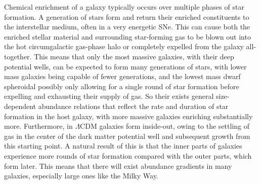 Chemical enrichment of a galaxy typically occurs over multiple phases of star formation. A generation of stars form and return their enriched constituents to the interstellar medium, often in a very energetic SNe. This can cause both the enriched stellar material and surrounding star-forming gas to be blown out into the hot circumgalactic gas-phase halo or completely expelled from the galaxy all-together. This means that only the most massive galaxies, with their deep potential wells, can be expected to form many generations of stars, with lower mass galaxies being capable of fewer generations, and the lowest mass dwarf spheroidal possibly only allowing for a single round of star formation before expelling and exhausting their supply of gas. So their exists general size-dependent abundance relations that reflect the rate and duration of star formation in the host galaxy, with more massive galaxies enriching substantially more. Furthermore, in $\Lambda$CDM galaxies form inside-out, owing to the settling of gas in the center of the dark matter potential well and subsequent growth from this starting point. A natural result of this is that the inner parts of galaxies experience more rounds of star formation compared with the outer parts, which form later. This means that there will exist abundance gradients in many galaxies, especially large ones like the Milky Way.

